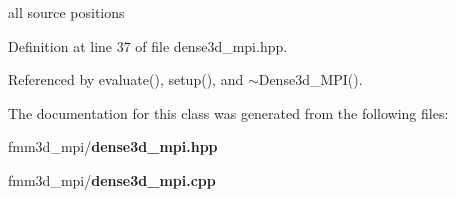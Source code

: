 all source positions 

Definition at line 37 of file dense3d\_\-mpi.hpp.

Referenced by evaluate(), setup(), and $\sim$Dense3d\_\-MPI().

The documentation for this class was generated from the following files:\begin{CompactItemize}
\item 
fmm3d\_\-mpi/{\bf dense3d\_\-mpi.hpp}\item 
fmm3d\_\-mpi/{\bf dense3d\_\-mpi.cpp}\end{CompactItemize}
